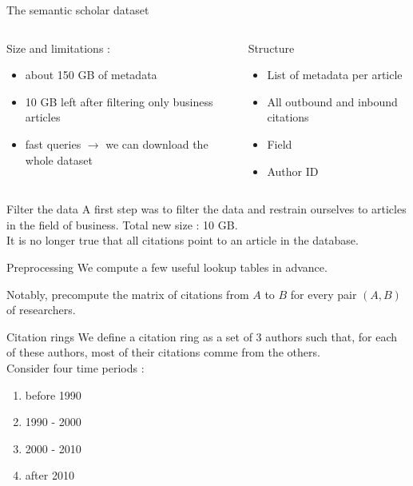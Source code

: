 \documentclass[10pt]{beamer}
\begin{document}
\begin{frame}{The semantic scholar dataset}
     \begin{columns}
    \begin{column}{0.5\textwidth}
   	Size and limitations : 
	\begin{itemize}
	  \item about 150 GB of metadata
	  \item 10 GB left after filtering only business articles
	  \item fast queries $\rightarrow$ we can download the whole dataset
	\end{itemize}
    \end{column}
    \begin{column}{0.5\textwidth}  %
      	Structure
        \begin{itemize}
       	  \item List of metadata per article
	  \item All outbound and inbound citations
	  \item Field
	  \item Author ID
	\end{itemize}
        \end{column}
    \end{columns}
  \end{frame}

\begin{frame}{Filter the data}
  A first step was to filter the data and restrain ourselves to articles in the field of business. Total new size : 10 GB. \\

  It is no longer true that all citations point to an article in the database.
  \end{frame}

\begin{frame}{Preprocessing}
  We compute a few useful lookup tables in advance.
  
  \vspace{0.7cm}

  Notably, precompute the matrix of citations from $A$ to $B$ for every pair $(A,B)$ of researchers.
  \end{frame}

\begin{frame}{Citation rings}
  We define a citation ring as a set of 3 authors such that, for each of these authors, most of their citations comme from the others. \\

  Consider four time periods : 
  \begin{enumerate}
    \item before 1990
    \item 1990 - 2000
    \item 2000 - 2010
    \item after 2010
  \end{enumerate}
  \end{frame}
\end{document}
